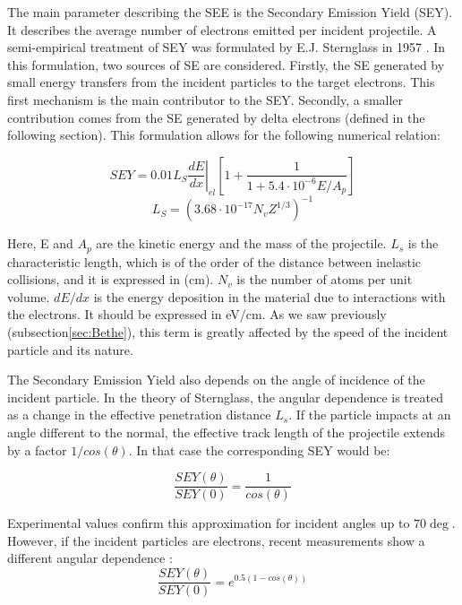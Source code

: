 The main parameter describing the SEE is the Secondary Emission Yield (SEY). It describes the average number of electrons emitted per incident projectile. A semi-empirical treatment of SEY was formulated by E.J. Sternglass in 1957 \parencite*[][]{ref:SEY}. In this formulation, two sources of SE are considered. Firstly, the SE generated by small energy transfers from the incident particles to the target electrons. This first mechanism is the main contributor to the SEY. Secondly, a smaller contribution comes from the SE generated by delta electrons (defined in the following section). This formulation allows for the following numerical relation: 

\begin{equation}
    SEY = 0.01 L_S \left. \frac{dE}{dx}\right|_{el} \left[ 1+\frac{1}{1+5.4\cdot 10^{-6} E/A_p}\right]
    \label{eq:sey}
\end{equation}
\begin{equation}
    L_S = \left( 3.68\cdot 10^{-17} N_v Z^{1/3} \right)^{-1}
    \label{eq:LS}
\end{equation}

Here, E and $A_p$ are the kinetic energy and the mass of the projectile. $L_{s}$ is the characteristic length, which is of the order of the distance between inelastic collisions, and it is expressed in (\si[]{\centi\metre}). $N_v$ is the number of atoms per unit volume. $dE/dx$ is the energy deposition in the material due to interactions with the electrons. It should be expressed in eV/cm. As we saw previously (subsection\ref{sec:Bethe}), this term is greatly affected by the speed of the incident particle and its nature. 

The Secondary Emission Yield also depends on the angle of incidence of the incident particle. In the theory of Sternglass, the angular dependence is treated as a change in the effective penetration distance $L_{s}$. If the particle impacts at an angle different to the normal, the effective track length of the projectile extends by a factor $1/cos(\theta)$. In that case the corresponding SEY would be: 

\begin{equation}
    \frac{SEY(\theta)}{SEY(0)} = \frac{1}{cos(\theta)}
\end{equation}

Experimental values confirm this approximation for incident angles up to $70\deg$. However, if the incident particles are electrons, recent measurements show a different angular dependence \parencite*[][]{ref:seyAngleEl}: 
\begin{equation}
    \frac{SEY(\theta)}{SEY(0)} = e^{0.5 \left(1-cos(\theta)\right)}
\end{equation}

